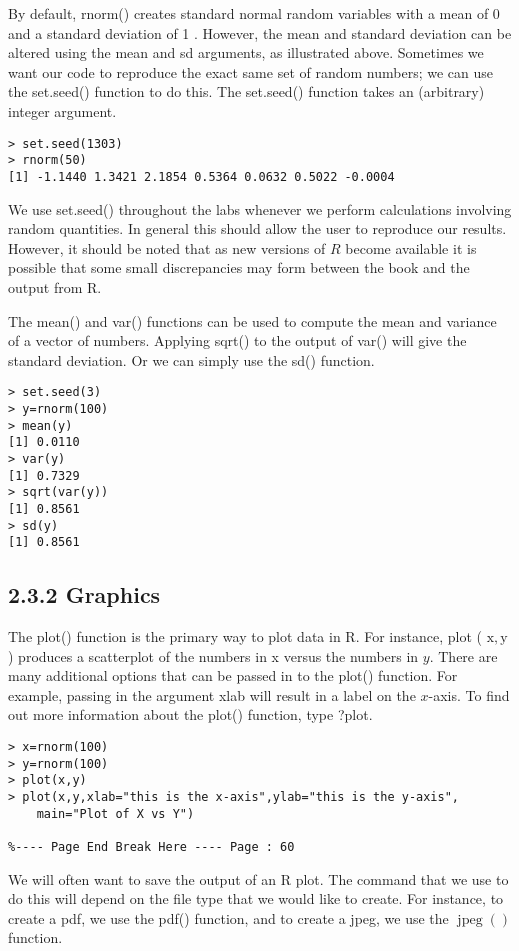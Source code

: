 \documentclass[10pt]{article}
\begin{document}
By default, rnorm() creates standard normal random variables with a mean of 0 and a standard deviation of 1 . However, the mean and standard deviation can be altered using the mean and sd arguments, as illustrated above. Sometimes we want our code to reproduce the exact same set of random numbers; we can use the set.seed() function to do this. The set.seed() function takes an (arbitrary) integer argument.

\begin{verbatim}
> set.seed(1303)
> rnorm(50)
[1] -1.1440 1.3421 2.1854 0.5364 0.0632 0.5022 -0.0004
\end{verbatim}

We use set.seed() throughout the labs whenever we perform calculations involving random quantities. In general this should allow the user to reproduce our results. However, it should be noted that as new versions of $R$ become available it is possible that some small discrepancies may form between the book and the output from R.

The mean() and var() functions can be used to compute the mean and variance of a vector of numbers. Applying sqrt() to the output of var() will give the standard deviation. Or we can simply use the sd() function.

\begin{verbatim}
> set.seed(3)
> y=rnorm(100)
> mean(y)
[1] 0.0110
> var(y)
[1] 0.7329
> sqrt(var(y))
[1] 0.8561
> sd(y)
[1] 0.8561
\end{verbatim}

\subsection*{2.3.2 Graphics}
The plot() function is the primary way to plot data in R. For instance, plot ( $\mathrm{x}, \mathrm{y}$ ) produces a scatterplot of the numbers in x versus the numbers in $y$. There are many additional options that can be passed in to the plot() function. For example, passing in the argument xlab will result in a label on the $x$-axis. To find out more information about the plot() function, type ?plot.

\begin{verbatim}
> x=rnorm(100)
> y=rnorm(100)
> plot(x,y)
> plot(x,y,xlab="this is the x-axis",ylab="this is the y-axis",
    main="Plot of X vs Y")

%---- Page End Break Here ---- Page : 60
\end{verbatim}

We will often want to save the output of an R plot. The command that we use to do this will depend on the file type that we would like to create. For instance, to create a pdf, we use the pdf() function, and to create a jpeg, we use the $\operatorname{jpeg}()$ function.
\end{document}

